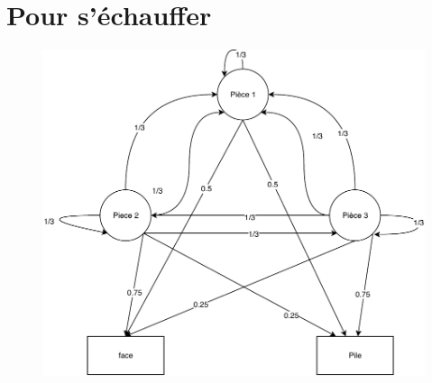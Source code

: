 \documentclass[
    a4paper,
    BCOR=6mm,
    DIV=calc,
    bibliography=totocnumbered,
    bibliography=openstyle,
    listof=leveldown
]{scrartcl}
\begin{document}
\maketitle

%

\section{Pour s'échauffer}

\begin{figure}[H]
	\centering
	\includegraphics[width=\linewidth]{diagramme_pieces.pdf}
	\caption{}
	\label{fig:diagramme_peices}
\end{figure}

\appendix
\end{document}
